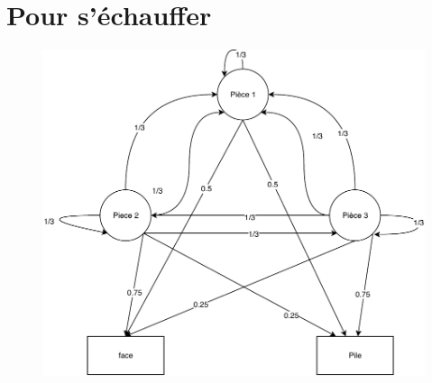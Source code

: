 \documentclass[
    a4paper,
    BCOR=6mm,
    DIV=calc,
    bibliography=totocnumbered,
    bibliography=openstyle,
    listof=leveldown
]{scrartcl}
\begin{document}
\maketitle

%

\section{Pour s'échauffer}

\begin{figure}[H]
	\centering
	\includegraphics[width=\linewidth]{diagramme_pieces.pdf}
	\caption{}
	\label{fig:diagramme_peices}
\end{figure}

\appendix
\end{document}
